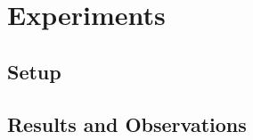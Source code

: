 \section{Experiments}
\label{ch:experiments}



\subsection{Setup}


\subsection{Results and Observations}


